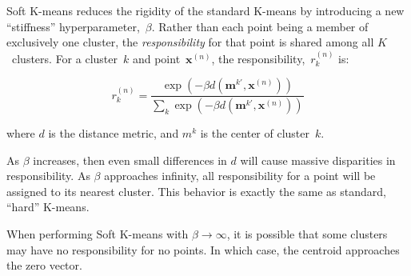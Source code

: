 \documentclass{report}
\begin{document}
  Soft K-means reduces the rigidity of the standard K-means by introducing a new ``stiffness'' hyperparameter,~$\beta$.  Rather than each point being a member of exclusively one cluster, the \textit{responsibility} for that point is shared among all $K$~clusters.  For a cluster~$k$ and point~$\textbf{x}^{(n)}$, the responsibility,~$r_{k}^{(n)}$ is:

  \begin{equation}
    r_k^{(n)} = \frac{\exp(-\beta d(\textbf{m}^{k'}, \textbf{x}^{(n)}))}{\sum_{k} \exp(-\beta d(\textbf{m}^{k'}, \textbf{x}^{(n)}))}
  \end{equation}

  \noindent
  where $d$ is the distance metric, and $m^{k}$ is the center of cluster~$k$.

  As $\beta$ increases, then even small differences in $d$ will cause massive disparities in responsibility.  As $\beta$ approaches infinity, all responsibility for a point will be assigned to its nearest cluster.  This behavior is exactly the same as standard, ``hard'' K-means.

  When performing Soft K-means with $\beta \rightarrow \infty$, it is possible that some clusters may have no responsibility for no points.  In which case, the centroid approaches the zero vector.
\end{document}
